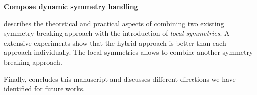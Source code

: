 \textbf{Compose dynamic symmetry handling}

 describes the theoretical and practical aspects of combining two existing
symmetry  breaking approach with the introduction of \textit{local symmetries}.
 A extensive experiments show that the hybrid approach is better than 
each approach individually. The local symmetries allows to combine another 
symmetry breaking approach.

Finally,  concludes this manuscript and discusses different directions we have identified for future works.
 

